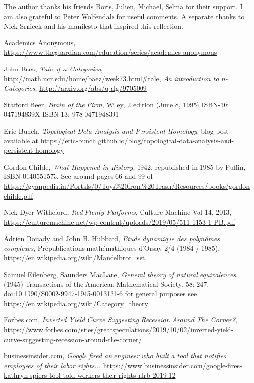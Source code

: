 \documentclass{article}
\begin{document}
The author thanks his friends Boris, Julien, Michael, Selma for their support. I am also grateful to Peter Wolfendale for useful comments.
A separate thanks to Nick Srnicek and his manifesto that inspired this reflection.

\small
\begin{thebibliography}{99}

 Academics Anonymous, \url{https://www.theguardian.com/education/series/academics-anonymous}



 John Baez, \textit{Tale of $n$-Categories}, \url{http://math.ucr.edu/home/baez/week73.html#tale}, \textit{An introduction to $n$-Categories}, \url{http://arxiv.org/abs/q-alg/9705009}

 Stafford Beer, \textit{Brain of the Firm}, Wiley, 2 edition (June 8, 1995)
ISBN-10: 047194839X
ISBN-13: 978-0471948391

 Eric Bunch, \textit{Topological Data Analysis and Persistent Homology}, blog post available at \url{https://eric-bunch.github.io/blog/topological-data-analysis-and-persistent-homology}

 Gordon Childe, \textit{What Happened in History}, 1942, republished in 1985 by Puffin, ISBN 0140551573. See around pages 66 and 99 of \url{https://gyanpedia.in/Portals/0/Toys%20from%20Trash/Resources/books/gordonchilde.pdf}

 Nick Dyer-Witheford, \textit{Red Plenty Platforms}, Culture Machine Vol 14, 2013, \url{https://culturemachine.net/wp-content/uploads/2019/05/511-1153-1-PB.pdf}

 Adrien Douady and John H. Hubbard, \textit{Etude dynamique des polyn\^omes complexes}, Pr\'epublications math\'emathiques d'Orsay 2/4 (1984 / 1985), \url{https://en.wikipedia.org/wiki/Mandelbrot_set}

 Samuel Eilenberg, Saunders MacLane, \textit{General theory of natural equivalences}, (1945) Transactions of the American Mathematical Society. 58: 247. doi:10.1090/S0002-9947-1945-0013131-6 for general purposes see \url{https://en.wikipedia.org/wiki/Category_theory}

 Forbes.com, \textit{Inverted Yield Curve Suggesting Recession Around The Corner?}, \url{https://www.forbes.com/sites/greatspeculations/2019/10/02/inverted-yield-curve-suggesting-recession-around-the-corner/}

 businessinsider.com, \textit{Google fired an engineer who built a tool that notified employees of their labor rights...} \url{https://www.businessinsider.com/google-fires-kathryn-spiers-tool-told-workers-their-rights-nlrb-2019-12}


\end{thebibliography}
\end{document}

